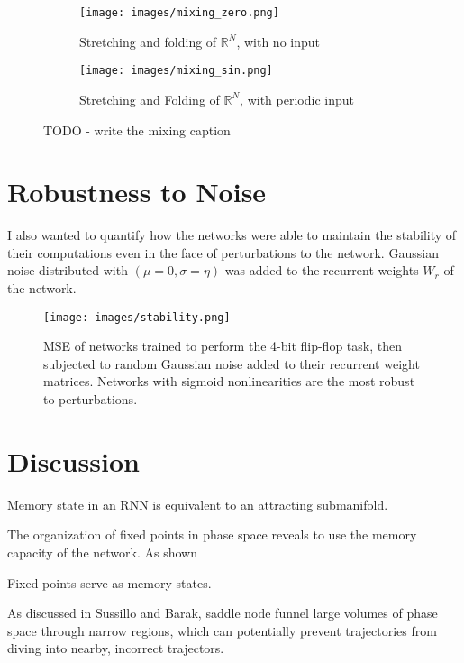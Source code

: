 \documentclass{article} %
\begin{document}
\begin{figure}
\centering
\begin{subfigure}{.5\textwidth}
  \centering
  \texttt{[image: images/mixing\_zero.png]}
  \caption{Stretching and folding of $\mathbb{R}^N$, with no input }
\end{subfigure}%
\begin{subfigure}{.5\textwidth}
  \centering
  \texttt{[image: images/mixing\_sin.png]}
  \caption{Stretching and Folding of $\mathbb{R}^N$, with periodic input}
\end{subfigure}
\caption{TODO - write the mixing caption}
\end{figure}



\section{Robustness to Noise}

I also wanted to quantify how the networks were able to maintain the stability of their computations even in the face of perturbations to the network. Gaussian noise distributed with $(\mu=0,\sigma=\eta)$ was added to the recurrent weights $W_r$ of the network.

\begin{figure}
\centering
\texttt{[image: images/stability.png]}
\caption{MSE of networks trained to perform the 4-bit flip-flop task, then subjected to random Gaussian noise added to their recurrent weight matrices. Networks with sigmoid nonlinearities are the most robust to perturbations.}
\label{fig:esn_arch}
\end{figure}


\section{Discussion}


Memory state in an RNN is equivalent to an attracting submanifold.

The organization of fixed points in phase space reveals to use the memory capacity of the network. As shown

Fixed points serve as memory states.

As discussed in Sussillo and Barak, saddle node funnel large volumes of phase space through narrow regions, which can potentially prevent trajectories from diving into nearby, incorrect trajectors.
\end{document}
